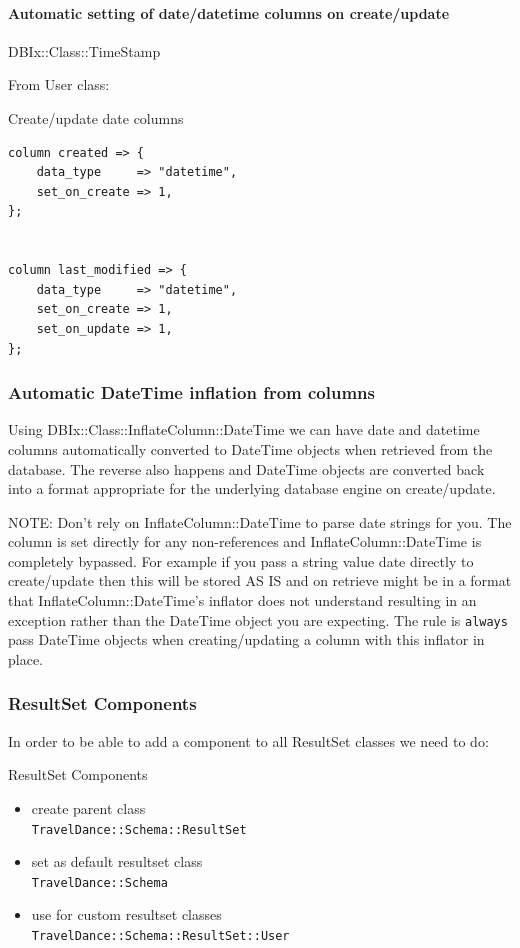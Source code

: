 \paragraph{Automatic setting of date/datetime columns on create/update}
DBIx::Class::TimeStamp

From User class:

\begin{frame}[fragile]{Create/update date columns}
\begin{lstlisting}
column created => {
    data_type     => "datetime",
    set_on_create => 1,
};


column last_modified => {
    data_type     => "datetime",
    set_on_create => 1,
    set_on_update => 1,
};
\end{lstlisting}
\end{frame}

\subsubsection{Automatic DateTime inflation from columns}

Using DBIx::Class::InflateColumn::DateTime we can have date and datetime
columns automatically converted to DateTime objects when retrieved from the
database. The reverse also happens and DateTime objects are converted back
into a format appropriate for the underlying database engine on
create/update.

NOTE: Don't rely on InflateColumn::DateTime to parse date strings for
you. The column is set directly for any non-references and
InflateColumn::DateTime is completely bypassed. For example if you pass a
string value date directly to create/update then this will be stored AS IS
and on retrieve might be in a format that InflateColumn::DateTime’s inflator
does not understand resulting in an exception rather than the DateTime
object you are expecting. The rule is \verb|always| pass DateTime objects when
creating/updating a column with this inflator in place.

\subsubsection{ResultSet Components}

In order to be able to add a component to all ResultSet classes we need to
do:

\begin{frame}[fragile]{ResultSet Components}
\begin{itemize}
\item create parent class \\
  \verb|TravelDance::Schema::ResultSet|
\item set as default resultset class \\
  \verb|TravelDance::Schema|
\item use for custom resultset classes \\
 \verb|TravelDance::Schema::ResultSet::User|
\end{itemize}
\end{frame}

